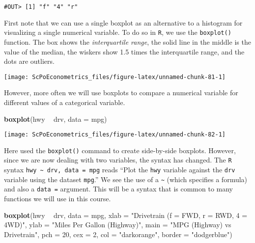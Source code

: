 \documentclass[]{book}
\newenvironment{Shaded}{\begin{snugshade}}{\end{snugshade}}
\newcommand{\KeywordTok}[1]{\textcolor[rgb]{0.13,0.29,0.53}{\textbf{#1}}}
\newcommand{\DataTypeTok}[1]{\textcolor[rgb]{0.13,0.29,0.53}{#1}}
\newcommand{\DecValTok}[1]{\textcolor[rgb]{0.00,0.00,0.81}{#1}}
\newcommand{\StringTok}[1]{\textcolor[rgb]{0.31,0.60,0.02}{#1}}
\newcommand{\OperatorTok}[1]{\textcolor[rgb]{0.81,0.36,0.00}{\textbf{#1}}}
\newcommand{\NormalTok}[1]{#1}
\begin{document}
\begin{verbatim}
#OUT> [1] "f" "4" "r"
\end{verbatim}

First note that we can use a single boxplot as an alternative to a
histogram for visualizing a single numerical variable. To do so in
\texttt{R}, we use the \texttt{boxplot()} function. The box shows the
\emph{interquartile range}, the solid line in the middle is the value of
the median, the wiskers show 1.5 times the interquartile range, and the
dots are outliers.

\begin{Shaded}
\end{Shaded}

\begin{center}\texttt{[image: ScPoEconometrics\_files/figure-latex/unnamed-chunk-81-1]} \end{center}

However, more often we will use boxplots to compare a numerical variable
for different values of a categorical variable.

\begin{Shaded}
\begin{Highlighting}[]
\KeywordTok{boxplot}\NormalTok{(hwy }\OperatorTok{~}\StringTok{ }\NormalTok{drv, }\DataTypeTok{data =}\NormalTok{ mpg)}
\end{Highlighting}
\end{Shaded}

\begin{center}\texttt{[image: ScPoEconometrics\_files/figure-latex/unnamed-chunk-82-1]} \end{center}

Here used the \texttt{boxplot()} command to create side-by-side
boxplots. However, since we are now dealing with two variables, the
syntax has changed. The \texttt{R} syntax
\texttt{hwy\ \textasciitilde{}\ drv,\ data\ =\ mpg} reads ``Plot the
\texttt{hwy} variable against the \texttt{drv} variable using the
dataset \texttt{mpg}.'' We see the use of a \texttt{\textasciitilde{}}
(which specifies a formula) and also a \texttt{data\ =} argument. This
will be a syntax that is common to many functions we will use in this
course.

\begin{Shaded}
\begin{Highlighting}[]
\KeywordTok{boxplot}\NormalTok{(hwy }\OperatorTok{~}\StringTok{ }\NormalTok{drv, }\DataTypeTok{data =}\NormalTok{ mpg,}
     \DataTypeTok{xlab   =} \StringTok{"Drivetrain (f = FWD, r = RWD, 4 = 4WD)"}\NormalTok{,}
     \DataTypeTok{ylab   =} \StringTok{"Miles Per Gallon (Highway)"}\NormalTok{,}
     \DataTypeTok{main   =} \StringTok{"MPG (Highway) vs Drivetrain"}\NormalTok{,}
     \DataTypeTok{pch    =} \DecValTok{20}\NormalTok{,}
     \DataTypeTok{cex    =} \DecValTok{2}\NormalTok{,}
     \DataTypeTok{col    =} \StringTok{"darkorange"}\NormalTok{,}
     \DataTypeTok{border =} \StringTok{"dodgerblue"}\NormalTok{)}
\end{Highlighting}
\end{Shaded}
\end{document}
